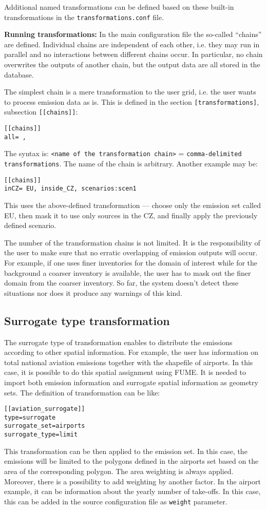\documentclass[a4paper,11pt]{article}
\begin{document}
Additional named transformations can be defined based on these built-in transformations in the \verb|transformations.conf| file.

\textbf{Running transformations:}
In the main configuration file the so-called ``chains'' are defined.
Individual chains are independent of each other, i.e. they may run in
parallel and no interactions between different chains occur. In
particular, no chain overwrites the outputs of another chain, but
the output data are all stored in the database. 

The simplest chain is a mere transformation to the user grid, i.e. the user wants to process emission data as is. This is defined in the section \verb|[transformations]|, subsection \verb|[[chains]]|:
\begin{verbatim}
[[chains]]
all= ,
\end{verbatim}
The syntax is: \verb|<name of the transformation chain>| = \verb|comma-delimited transformations|. The name of the chain is arbitrary. Another example may be:
\begin{verbatim}
[[chains]]
inCZ= EU, inside_CZ, scenarios:scen1
\end{verbatim}
This uses the above-defined transformation --- choose only the emission set called EU, then mask it to use only sources in the CZ, and finally apply the previously defined scenario.

The number of the transformation chains is not limited.
It is the responsibility of the user to make sure that no erratic
overlapping of emission outputs will occur. For example, if one uses
finer inventories for the domain of interest while for the background a
coarser inventory is available, the user has to mask out the finer
domain from the coarser inventory. So far, the system doesn't detect
these situations nor does it produce any warnings of this kind.

\subsection{Surrogate type transformation}\label{surrogates}
The surrogate type of transformation enables to distribute the emissions according to other spatial information. For example, the user has information on total national aviation emissions together with the shapefile of airports. In this case, it is possible to do this spatial assignment using FUME. It is needed to import both emission information and surrogate spatial information as geometry sets. The definition of transformation can be like:
\begin{verbatim}
[[aviation_surrogate]]
type=surrogate
surrogate_set=airports
surrogate_type=limit
\end{verbatim}
This transformation can be then applied to the emission set. In this case, the emissions will be limited to the polygons defined in the airports set based on the area of the corresponding polygon. The area weighting is always applied. Moreover, there is a possibility to add weighting by another factor. In the airport example, it can be information about the yearly number of take-offs. In this case, this can be added in the source configuration file as \verb|weight| parameter.
\end{document}
